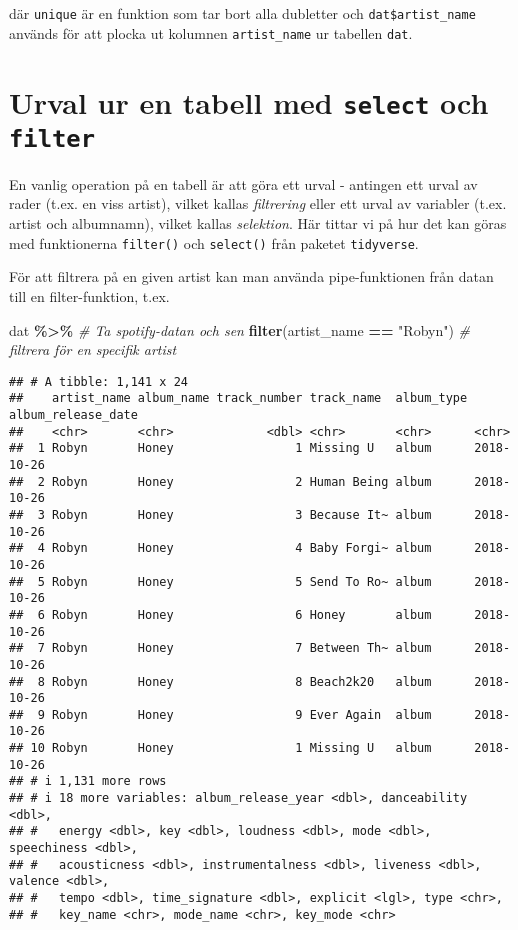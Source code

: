 \documentclass[
]{book}
\newenvironment{Shaded}{\begin{snugshade}}{\end{snugshade}}
\newcommand{\CommentTok}[1]{\textcolor[rgb]{0.56,0.35,0.01}{\textit{#1}}}
\newcommand{\FunctionTok}[1]{\textcolor[rgb]{0.13,0.29,0.53}{\textbf{#1}}}
\newcommand{\NormalTok}[1]{#1}
\newcommand{\SpecialCharTok}[1]{\textcolor[rgb]{0.81,0.36,0.00}{\textbf{#1}}}
\newcommand{\StringTok}[1]{\textcolor[rgb]{0.31,0.60,0.02}{#1}}
\theoremstyle{definition}
\theoremstyle{definition}
\theoremstyle{definition}
\theoremstyle{definition}
\theoremstyle{remark}
\begin{document}
där \texttt{unique} är en funktion som tar bort alla dubletter och \texttt{dat\$artist\_name} används för att plocka ut kolumnen \texttt{artist\_name} ur tabellen \texttt{dat}.

\hypertarget{urval-ur-en-tabell-med-select-och-filter}{%
\section{\texorpdfstring{Urval ur en tabell med \texttt{select} och \texttt{filter}}{Urval ur en tabell med select och filter}}\label{urval-ur-en-tabell-med-select-och-filter}}

En vanlig operation på en tabell är att göra ett urval - antingen ett urval av rader (t.ex. en viss artist), vilket kallas \emph{filtrering} eller ett urval av variabler (t.ex. artist och albumnamn), vilket kallas \emph{selektion}. Här tittar vi på hur det kan göras med funktionerna \texttt{filter()} och \texttt{select()} från paketet \texttt{tidyverse}.

För att filtrera på en given artist kan man använda pipe-funktionen från datan till en filter-funktion, t.ex.

\begin{Shaded}
\begin{Highlighting}[]
\NormalTok{dat }\SpecialCharTok{\%\textgreater{}\%}                                \CommentTok{\# Ta spotify{-}datan och sen}
  \FunctionTok{filter}\NormalTok{(artist\_name }\SpecialCharTok{==} \StringTok{"Robyn"}\NormalTok{)       }\CommentTok{\# filtrera för en specifik artist}
\end{Highlighting}
\end{Shaded}

\begin{verbatim}
## # A tibble: 1,141 x 24
##    artist_name album_name track_number track_name  album_type album_release_date
##    <chr>       <chr>             <dbl> <chr>       <chr>      <chr>             
##  1 Robyn       Honey                 1 Missing U   album      2018-10-26        
##  2 Robyn       Honey                 2 Human Being album      2018-10-26        
##  3 Robyn       Honey                 3 Because It~ album      2018-10-26        
##  4 Robyn       Honey                 4 Baby Forgi~ album      2018-10-26        
##  5 Robyn       Honey                 5 Send To Ro~ album      2018-10-26        
##  6 Robyn       Honey                 6 Honey       album      2018-10-26        
##  7 Robyn       Honey                 7 Between Th~ album      2018-10-26        
##  8 Robyn       Honey                 8 Beach2k20   album      2018-10-26        
##  9 Robyn       Honey                 9 Ever Again  album      2018-10-26        
## 10 Robyn       Honey                 1 Missing U   album      2018-10-26        
## # i 1,131 more rows
## # i 18 more variables: album_release_year <dbl>, danceability <dbl>,
## #   energy <dbl>, key <dbl>, loudness <dbl>, mode <dbl>, speechiness <dbl>,
## #   acousticness <dbl>, instrumentalness <dbl>, liveness <dbl>, valence <dbl>,
## #   tempo <dbl>, time_signature <dbl>, explicit <lgl>, type <chr>,
## #   key_name <chr>, mode_name <chr>, key_mode <chr>
\end{verbatim}
\end{document}
